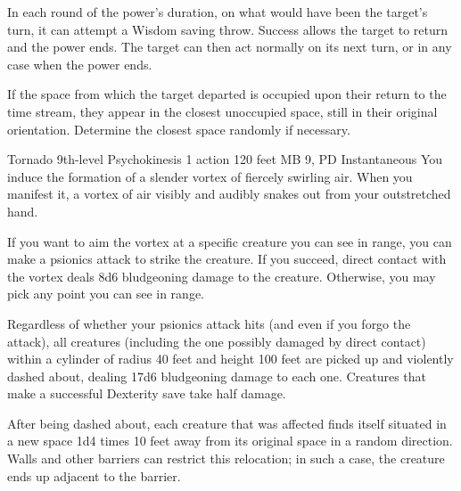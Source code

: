   In each round of the power's duration,
  on what would have been the target's turn,
  it can attempt a Wisdom saving throw.
  Success allows the target to return and the power ends.
  The target can then act normally on its next turn,
  or in any case when the power ends.
  
  If the space from which the target departed is occupied
  upon their return to the time stream,
  they appear in the closest unoccupied space,
  still in their original orientation.
  Determine the closest space randomly if necessary.

\DndPowerHeader%
  {Tornado}
  {9th-level Psychokinesis}
  {1 action}
  {120 feet}
  {MB 9, PD \lvlnine}
  {Instantaneous}
  You induce the formation of a slender vortex
  of fiercely swirling air.
  When you manifest it,
  a vortex of air visibly and audibly snakes out from your
  outstretched hand.

  If you want to aim the vortex at a specific creature
  you can see in range,
  you can make a psionics attack to strike the creature.
  If you succeed,
  direct contact with the vortex deals 8d6 bludgeoning damage
  to the creature.
  Otherwise,
  you may pick any point you can see in range.
  
  Regardless of whether your psionics attack hits
  (and even if you forgo the attack),
  all creatures
  (including the one possibly damaged by direct contact)
  within a cylinder of radius 40 feet
  and height 100 feet
  are picked up and violently dashed about,
  dealing 17d6 bludgeoning damage to each one.
  Creatures that make a successful Dexterity save
  take half damage.
  
  After being dashed about,
  each creature that was affected finds itself situated
  in a new space 1d4 times 10 feet
  away from its original space in a random direction.
  Walls and other barriers can restrict this relocation;
  in such a case,
  the creature ends up adjacent to the barrier.

